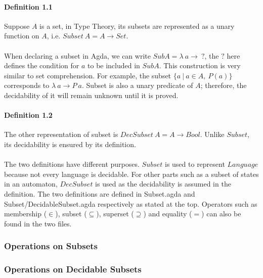 \paragraph{Definition 1.1} Suppose \(A\) is a set, in Type Theory, its
subsets are represented as a unary function on
\(A\), i.e. \(Subset\ A = A \to Set\). 

\paragraph{} When declaring a subset in Agda, we can write \(SubA =
\lambda\ a \to\ ?\), the \(?\) here defines the
condition for \(a\) to be included in \(SubA\). This construction is
very similar to set comprehension. For example, the subset 
\(\{a\ | \ a \in A,\ P(a)\}\) corresponds to \(\lambda\ a \to P\
a\). Subset is also a unary predicate of \(A\); therefore, the decidability of it will remain
unknown until it is proved. 

\paragraph{Definition 1.2} The other representation of subset is \(DecSubset\ A = A \to
Bool\). Unlike \(Subset\), its decidability is ensured by its
definition. 

\paragraph{} The two definitions have different purposes. \(Subset\) is used to represent \(Language\) because not every
language is decidable. For other parts 
such as a subset of states in an automaton, \(DecSubset\) is used
as the decidability is assumed in the definition. The two definitions
are defined in Subset.agda and Subset/DecidableSubset.agda
respectively as stated at the top. Operators such as membership (\(\in\)), subset
(\(\subseteq\)), superset (\(\supseteq\)) and equality (\(=\)) can
also be found in the two files. 

\subsubsection{Operations on Subsets}
\paragraph{}

\subsubsection{Operations on Decidable Subsets}
